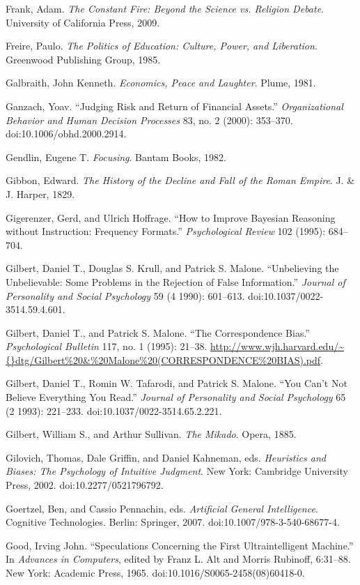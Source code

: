 {
 Frank, Adam. \textit{The Constant Fire: Beyond the Science vs.
Religion Debate}. University of California Press, 2009.}

{
 Freire, Paulo. \textit{The Politics of Education: Culture, Power,
and Liberation}. Greenwood Publishing Group, 1985.}

{
 Galbraith, John Kenneth. \textit{Economics, Peace and Laughter}.
Plume, 1981.}

{
 Ganzach, Yoav. ``Judging Risk and Return of
Financial Assets.'' \textit{Organizational Behavior
and Human Decision Processes} 83, no. 2 (2000): 353--370.
doi:10.1006/obhd.2000.2914.}

{
 Gendlin, Eugene T. \textit{Focusing}. Bantam Books, 1982.}

{
 Gibbon, Edward. \textit{The History of the Decline and Fall of the
Roman Empire}. J. \& J. Harper, 1829.}

{
 Gigerenzer, Gerd, and Ulrich Hoffrage. ``How to
Improve Bayesian Reasoning without Instruction: Frequency
Formats.'' \textit{Psychological Review} 102 (1995):
684--704.}

{
 Gilbert, Daniel T., Douglas S. Krull, and Patrick S. Malone.
``Unbelieving the Unbelievable: Some Problems in the
Rejection of False Information.'' \textit{Journal of
Personality and Social Psychology} 59 (4 1990): 601--613.
doi:10.1037/0022-3514.59.4.601.}

{
 Gilbert, Daniel T., and Patrick S. Malone. ``The
Correspondence Bias.'' \textit{Psychological
Bulletin} 117, no. 1 (1995): 21--38.
\url{http://www.wjh.harvard.edu/\~{}dtg/Gilbert\%20\&\%20Malone\%20(CORRESPONDENCE\%20BIAS).pdf}.}

{
 Gilbert, Daniel T., Romin W. Tafarodi, and Patrick S. Malone.
``You Can't Not Believe Everything You
Read.'' \textit{Journal of Personality and Social
Psychology} 65 (2 1993): 221--233. doi:10.1037/0022-3514.65.2.221.}

{
 Gilbert, William S., and Arthur Sullivan. \textit{The Mikado}.
Opera, 1885.}

{
 Gilovich, Thomas, Dale Griffin, and Daniel Kahneman, eds.
\textit{Heuristics and Biases: The Psychology of Intuitive Judgment}.
New York: Cambridge University Press, 2002. doi:10.2277/0521796792.}

{
 Goertzel, Ben, and Cassio Pennachin, eds. \textit{Artificial
General Intelligence}. Cognitive Technologies. Berlin: Springer, 2007.
doi:10.1007/978-3-540-68677-4.}

{
 Good, Irving John. ``Speculations Concerning the
First Ultraintelligent Machine.'' In \textit{Advances
in Computers}, edited by Franz L. Alt and Morris Rubinoff, 6:31--88.
New York: Academic Press, 1965. doi:10.1016/S0065-2458(08)60418-0.}

